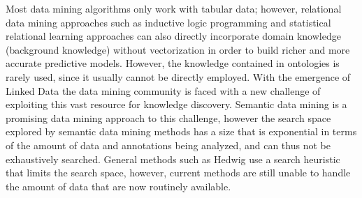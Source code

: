 \documentclass[a4paper,11pt]{article}
\begin{document}
Most data mining algorithms only work with tabular data; however, relational data mining  approaches such as inductive logic programming and statistical relational learning approaches \citep{PageDavid:2012:RelationalLearning} can also directly incorporate domain knowledge (background knowledge) without vectorization in order to build richer and more accurate predictive models. However, the knowledge contained in ontologies is rarely used, since it usually cannot be directly employed. With the  emergence of Linked Data \citep{Bizer2009} the data mining community is faced with a new challenge of exploiting this vast resource for knowledge discovery. Semantic data mining  
is a promising data mining approach to this challenge, however the search space explored by semantic data mining methods has a size that is exponential in terms of the amount of data and annotations being analyzed, and can thus not be exhaustively searched. General methods such as Hedwig \citep{Vavpetic2013} use a search heuristic that limits the search space, however, current methods are still unable to handle the amount of data that are now routinely available.
\end{document}

